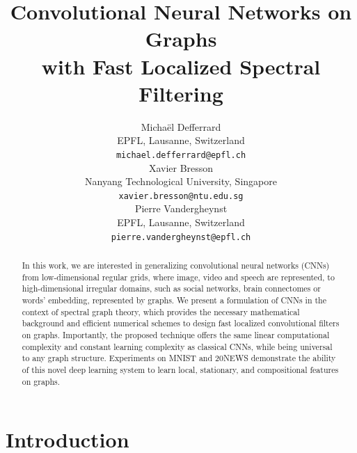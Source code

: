 \documentclass{article}
\title{Convolutional Neural Networks on Graphs\\
with Fast Localized Spectral Filtering\\}
\author{
  Michaël Defferrard \\ %
  EPFL, Lausanne, Switzerland \\
  \texttt{michael.defferrard@epfl.ch} \\
  \And %
  Xavier Bresson \\
  Nanyang Technological University, Singapore \\
  \texttt{xavier.bresson@ntu.edu.sg} \\
  \And %
  Pierre Vandergheynst \\
  EPFL, Lausanne, Switzerland \\
  \texttt{pierre.vandergheynst@epfl.ch} \\
}
\begin{document}
\maketitle

\begin{abstract}

In this work, we are interested in generalizing convolutional neural networks
(CNNs) from low-dimensional regular grids, where image, video and speech are
represented, to high-dimensional irregular domains, such as social networks,
brain connectomes or words’ embedding, represented by graphs.
We present a formulation of CNNs in the context of spectral graph theory, which
provides the necessary mathematical background and efficient numerical schemes
to design fast localized convolutional filters on graphs. Importantly, the
proposed technique offers the same linear computational complexity and constant
learning complexity as classical CNNs, while being universal to any graph
structure. Experiments on MNIST and 20NEWS demonstrate the ability of this
novel deep learning system to learn local, stationary, and compositional
features on graphs.

	
\end{abstract}


\section{Introduction}


\end{document}
